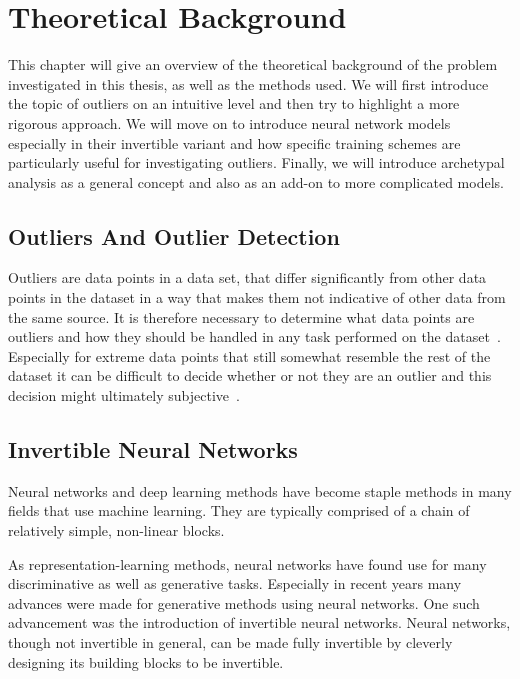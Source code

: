 \chapter{Theoretical Background}%
\label{cha:background}

This chapter will give an overview of the theoretical background of the problem
investigated in this thesis, as well as the methods used. We will first
introduce the topic of outliers on an intuitive level and then try to highlight
a more rigorous approach. We will move on to introduce neural network models
especially in their invertible variant and how specific training schemes are
particularly useful for investigating outliers. Finally, we will introduce
archetypal analysis as a general concept and also as an add-on to more
complicated models.


\section{Outliers And Outlier Detection}%
\label{sec:outliers_an_outlier_detection}

Outliers are data points in a data set, that differ significantly from other
data points in the dataset in a way that makes them not indicative of other
data from the same source. It is therefore necessary to determine what data
points are outliers and how they should be handled in any task performed on the
dataset~\citep{europeanmathematicalsocietyOutlierEncyclopediaMathematics}.
Especially for extreme data points that still somewhat resemble the rest of the
dataset it can be difficult to decide whether or not they are an outlier and
this decision might ultimately subjective~\citep{zimekThereBackAgain2018}.


\section{Invertible Neural Networks}%
\label{sec:invertible_neural_networks}

Neural networks and deep learning methods have become staple methods in many
fields that use machine learning. They are typically comprised of a chain of relatively
simple, non-linear blocks.~\citep{lecunDeepLearning2015}

As representation-learning methods, neural networks have found use for
many discriminative as well as generative tasks. Especially in recent years
many advances were made for generative methods using neural networks. One such
advancement was the introduction of invertible neural networks. Neural
networks, though not invertible in general, can be made fully invertible by
cleverly designing its building blocks to be invertible.

